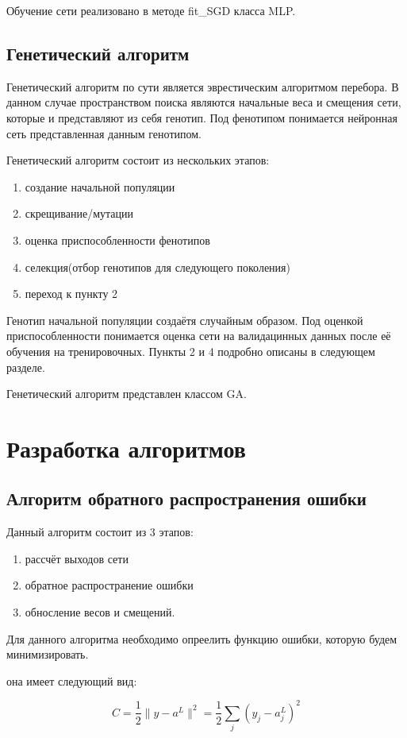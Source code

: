 \documentclass[a4paper,12pt]{article}
\begin{document}
Обучение сети реализовано в методе fit\_SGD класса MLP.
\subsection{Генетический алгоритм}
Генетический алгоритм по сути является эврестическим алгоритмом перебора. В данном случае пространством поиска являются начальные веса и смещения сети, которые и представляют из себя генотип. Под фенотипом понимается нейронная сеть представленная данным генотипом.

Генетический алгоритм состоит из нескольких этапов:
\begin{enumerate}
\item создание начальной популяции
\item скрещивание/мутации
\item оценка приспособленности фенотипов
\item селекция(отбор генотипов для следующего поколения)
\item переход к пункту 2
\end{enumerate}

Генотип начальной популяции создаётя случайным образом. Под оценкой приспособленности понимается оценка сети на валидацинных данных после её обучения на тренировочных. Пункты 2 и 4 подробно описаны в следующем разделе.

Генетический алгоритм представлен классом GA.

\newpage\section{Разработка алгоритмов}

\subsection{Алгоритм обратного распространения ошибки}
Данный алгоритм состоит из 3 этапов:
\begin{enumerate}
\item рассчёт выходов сети
\item обратное распространение ошибки 
\item обносление весов и смещений.
\end{enumerate}

Для данного алгоритма необходимо опреелить функцию ошибки, которую будем минимизировать.

она имеет следующий вид:

{\large $$ C = \frac{1}{2} \|y-a^L\|^2 = \frac{1}{2} \sum_j (y_j-a^L_j)^2 $$}
\end{document}

